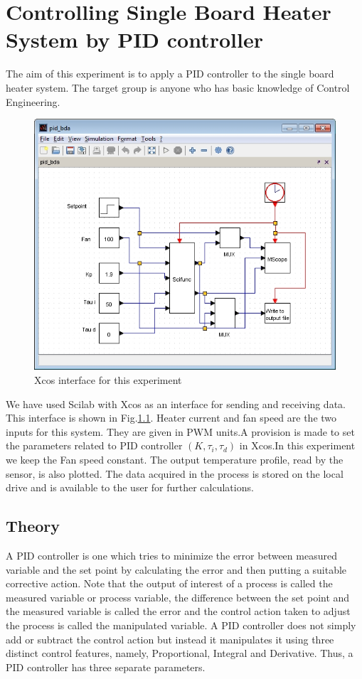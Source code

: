 \chapter {Controlling Single Board Heater System by PID controller}
The aim of this experiment is to apply a PID controller to the single board heater system. The target group is anyone who has basic knowledge of Control Engineering.
\begin{figure}
\centering
\includegraphics[width=0.7\linewidth]{pid_manual/pid_xcos.jpg}
\caption{Xcos interface for this experiment}
\label{Xcos_pid}
\end{figure}
We have used Scilab with Xcos as an interface for sending and receiving data. This interface is shown in Fig.\ref{Xcos_pid}. Heater current and fan speed are the two inputs for this system. They are given in PWM units.A provision is made to set the parameters related to PID controller $(K,\tau_i,\tau_d)$ in Xcos.In this experiment we keep the Fan speed constant. The output temperature profile, read by the sensor, is also plotted. The data acquired in the process is stored on the local drive and is available to the user for further calculations.
\section{Theory}
A PID controller is one which tries to minimize the error between measured variable and the set point by calculating the error and then putting a suitable corrective action. Note that the output of interest of a process is called the measured variable or process variable, the difference between the set point and the measured variable is called the error and the control action taken to adjust the process is called the manipulated variable. A PID controller does not simply add or subtract the control action but instead it manipulates it using three distinct control features, namely, Proportional, Integral and Derivative. Thus, a PID controller has three separate parameters.
